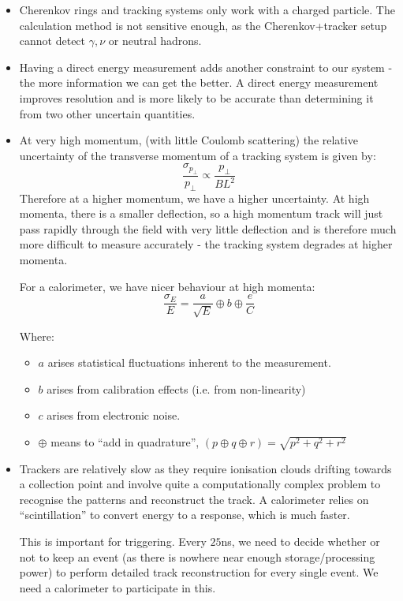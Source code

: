 \begin{itemize}
    \item Cherenkov rings and tracking systems only work with a charged particle. The calculation method is not sensitive enough, as the Cherenkov+tracker setup cannot detect $\gamma, \nu$ or neutral hadrons.
    \item Having a direct energy measurement adds another constraint to our system - the more information we can get the better. A direct energy measurement improves resolution and is more likely to be accurate than determining it from two other uncertain quantities.
    \item At very high momentum, (with little Coulomb scattering) the relative uncertainty of the transverse momentum of a tracking system is given by:
    \[
        \frac{\sigma_{p_\perp}}{p_\perp} \propto \frac{p_\perp}{BL^2}
    \]
    Therefore at a higher momentum, we have a higher uncertainty. At high momenta, there is a smaller deflection, so a high momentum track will just pass rapidly through the field with very little deflection and is therefore much more difficult to measure accurately - the tracking system degrades at higher momenta.
    
    For a calorimeter, we have nicer behaviour at high momenta:
    \[
        \frac{\sigma_E}{E} = \frac{a}{\sqrt{E}} \oplus b \oplus \frac{e}{C}    
    \]

    Where:
    \begin{itemize}
        \item $a$ arises statistical fluctuations inherent to the measurement.
        \item $b$ arises from calibration effects (i.e. from non-linearity)
        \item $c$ arises from electronic noise.
        \item $\oplus$ means to ``add in quadrature'', $(p \oplus q \oplus r) = \sqrt{p^2 + q^2 + r^2}$
    \end{itemize}
    
    \item Trackers are relatively slow as they require ionisation clouds drifting towards a collection point and involve quite a computationally complex problem to recognise the patterns and reconstruct the track. A calorimeter relies on  ``scintillation'' to convert energy to a response, which is much faster. 
    
    This is important for triggering. Every $25$ns, we need to decide whether or not to keep an event (as there is nowhere near enough storage/processing power) to perform detailed track reconstruction for every single event. We need a calorimeter to participate in this.
\end{itemize}

